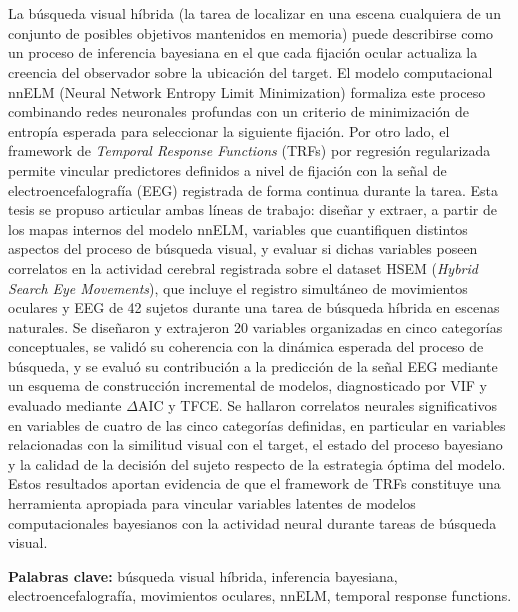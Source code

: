 \chapter*{\runtitulo}

\noindent

La búsqueda visual híbrida (la tarea de localizar en una escena cualquiera de un conjunto de posibles objetivos mantenidos en memoria) puede describirse como un proceso de inferencia bayesiana en el que cada fijación ocular actualiza la creencia del observador sobre la ubicación del target. El modelo computacional nnELM (Neural Network Entropy Limit Minimization) \citep{ruarte2025} formaliza este proceso combinando redes neuronales profundas con un criterio de minimización de entropía esperada para seleccionar la siguiente fijación. Por otro lado, el framework de \textit{Temporal Response Functions} (TRFs) por regresión regularizada \citep{care2025} permite vincular predictores definidos a nivel de fijación con la señal de electroencefalografía (EEG) registrada de forma continua durante la tarea. Esta tesis se propuso articular ambas líneas de trabajo: diseñar y extraer, a partir de los mapas internos del modelo nnELM, variables que cuantifiquen distintos aspectos del proceso de búsqueda visual, y evaluar si dichas variables poseen correlatos en la actividad cerebral registrada sobre el dataset HSEM (\textit{Hybrid Search Eye Movements}), que incluye el registro simultáneo de movimientos oculares y EEG de 42 sujetos durante una tarea de búsqueda híbrida en escenas naturales. Se diseñaron y extrajeron 20 variables organizadas en cinco categorías conceptuales, se validó su coherencia con la dinámica esperada del proceso de búsqueda, y se evaluó su contribución a la predicción de la señal EEG mediante un esquema de construcción incremental de modelos, diagnosticado por VIF y evaluado mediante $\Delta$AIC y TFCE. Se hallaron correlatos neurales significativos en variables de cuatro de las cinco categorías definidas, en particular en variables relacionadas con la similitud visual con el target, el estado del proceso bayesiano y la calidad de la decisión del sujeto respecto de la estrategia óptima del modelo. Estos resultados aportan evidencia de que el framework de TRFs constituye una herramienta apropiada para vincular variables latentes de modelos computacionales bayesianos con la actividad neural durante tareas de búsqueda visual.

\bigskip

\noindent\textbf{Palabras clave:} búsqueda visual híbrida, inferencia bayesiana, electroencefalografía, movimientos oculares, nnELM, temporal response functions.
